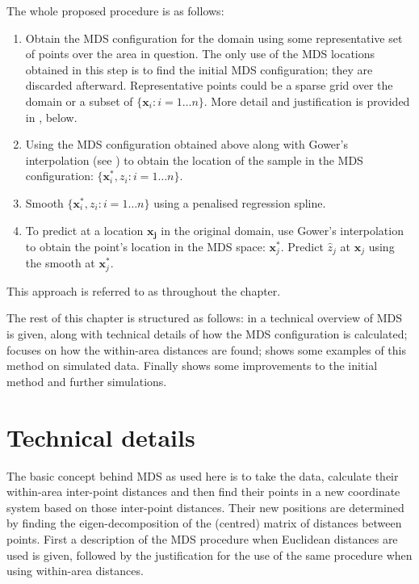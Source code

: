 The whole proposed procedure is as follows:

\begin{enumerate}
\item Obtain the MDS configuration for the domain using some representative set of points over the area in question. The only use of the MDS locations obtained in this step is to find the initial MDS configuration; they are discarded afterward. Representative points could be a sparse grid over the domain or a subset of $\{\mathbf{x}_i : i=1\dots n\}$. More detail and justification is provided in , below.

\item Using the MDS configuration obtained above along with Gower's interpolation (see ) to obtain the location of the sample in the MDS configuration: $\{\mathbf{x}_i^*, z_i : i=1\dots n\}$.

\item Smooth $\{\mathbf{x}_i^*, z_i : i=1\dots n\}$ using a penalised regression spline.

\item To predict at a location $\mathbf{x_j}$ in the original domain, use Gower's interpolation to obtain the point's location in the MDS space: $\mathbf{x}_j^*$. Predict $\hat{z}_j$ at $\mathbf{x}_j$ using the smooth at $\mathbf{x}_j^*$.
\end{enumerate}

This approach is referred to as \mdsap throughout the chapter.

The rest of this chapter is structured as follows: in  a technical overview of MDS is given, along with technical details of how the MDS configuration is calculated;  focuses on how the within-area distances are found;  shows some examples of this method on simulated data. Finally  shows some improvements to the initial method and further simulations.


\section{Technical details}
\label{MDStechdet}

The basic concept behind MDS as used here is to take the data, calculate their within-area inter-point distances and then find their points in a new coordinate system based on those inter-point distances. Their new positions are determined by finding the eigen-decomposition of the (centred) matrix of distances between points. First a description of the MDS procedure when Euclidean distances are used is given, followed by the justification for the use of the same procedure when using within-area distances. 

